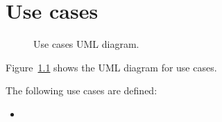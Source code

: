 \chapter{Use cases}\label{ch:usecases}

\begin{figure}[ht]
	\caption{Use cases UML diagram.}
	\label{fig:usecases}
\end{figure}

Figure~\ref{fig:usecases} shows the UML diagram for use cases.

The following use cases are defined:
\begin{itemize}
	\item \textellipsis
\end{itemize}
